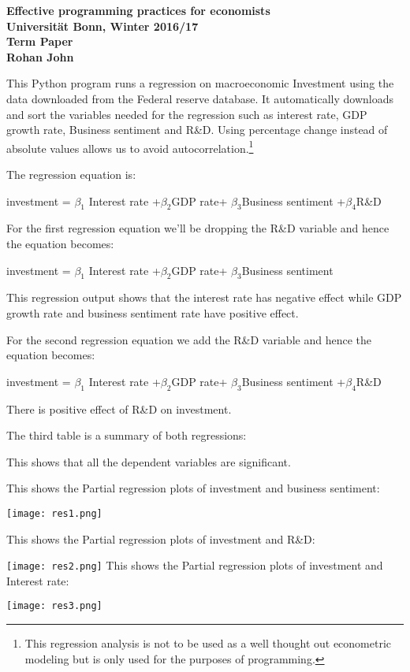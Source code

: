 \documentclass[12pt,a4paper,leqno]{report}
\theoremstyle{definition}
\begin{document}
	
	\begin{center}
		\begin{large}
			\textbf{
				Effective programming practices for economists\\
				Universität Bonn, Winter 2016/17 \\[2ex]
				Term Paper\\[2ex]
				Rohan John
			}
		\end{large}
	\end{center}

This Python program runs a regression on macroeconomic Investment using the data downloaded from the Federal reserve database. It automatically downloads and sort the variables needed for the regression such as interest rate, GDP growth rate, Business sentiment and R\&D. Using percentage change instead of absolute values allows us to avoid autocorrelation.\footnote{This regression analysis is not to be used as a well thought out econometric modeling but is only used for the purposes of programming.}

The regression equation is: \newline
\begin{center}
	investment = $\beta_{1}$ Interest rate +$\beta_{2}$GDP rate+ $\beta_{3}$Business sentiment +$\beta_{4}$R\&D
\end{center}

For the first regression equation we'll be dropping the R\&D variable and hence the equation becomes: \newline
\begin{center}
	investment = $\beta_{1}$ Interest rate +$\beta_{2}$GDP rate+ $\beta_{3}$Business sentiment 
\end{center}


This regression output shows that the interest rate has negative effect while GDP growth rate and business sentiment rate have positive effect.


For the second regression equation we add the R\&D variable and hence the equation becomes: \newline
\begin{center}
investment = $\beta_{1}$ Interest rate +$\beta_{2}$GDP rate+ $\beta_{3}$Business sentiment +$\beta_{4}$R\&D
\end{center}


There is positive effect of R\&D on investment.


\newpage
The third table is a summary of both regressions:

This shows that all the dependent variables are significant.

\newpage
This shows the Partial regression plots of investment and business sentiment:

\texttt{[image: res1.png]}
\newline

This shows the Partial regression plots of investment and R\&D:

\texttt{[image: res2.png]}
\newpage
This shows the Partial regression plots of investment and Interest rate:

\texttt{[image: res3.png]}
\end{document}
